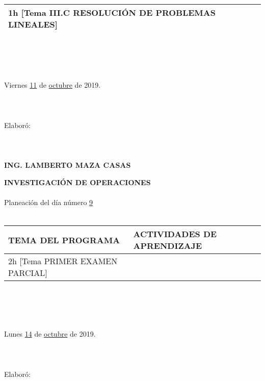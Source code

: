 \documentclass[landscape]{article}
\begin{document}
{\begin{center}
\begin{tabular}{|p{11cm}|p{8cm}|}
	1h	[Tema III.C RESOLUCI\'ON DE PROBLEMAS LI\-NEA\-LES]
&\\
\hline
\end{tabular}
\ \\
\ \\
\ \\
\ \\
Viernes \underline{\hspace{0.5cm}11\hspace{0.5cm}} de  \underline{\hspace{0.5cm}octubre\hspace{0.5cm}} de 2019.
\ \\
\ \\
\ \\
\ \\
Elabor\'o:
\ \\
\ \\
\ \\
\ \\
{\bf ING. LAMBERTO MAZA CASAS}
\end{center}
\eject
\begin{center}
{\bf 
INVESTIGACI\'ON DE OPERACIONES
}
\ \\
\ \\
Planeaci\'on del d\'ia n\'umero \underline{\hspace{0.5cm}9\hspace{0.5cm}}
\ \\
\ \\
\begin{tabular}{|p{11cm}|p{8cm}|}\hline
{\bf TEMA DEL PROGRAMA}&{\bf ACTIVIDADES DE APRENDIZAJE}\\\hline
	2h	[Tema PRIMER EXAMEN PARCIAL]
&\\
\hline
\end{tabular}
\ \\
\ \\
\ \\
\ \\
Lunes \underline{\hspace{0.5cm}14\hspace{0.5cm}} de  \underline{\hspace{0.5cm}octubre\hspace{0.5cm}} de 2019.
\ \\
\ \\
\ \\
\ \\
Elabor\'o:
\ \\
\ \\
\ \\

\end{center}}
\end{document}
